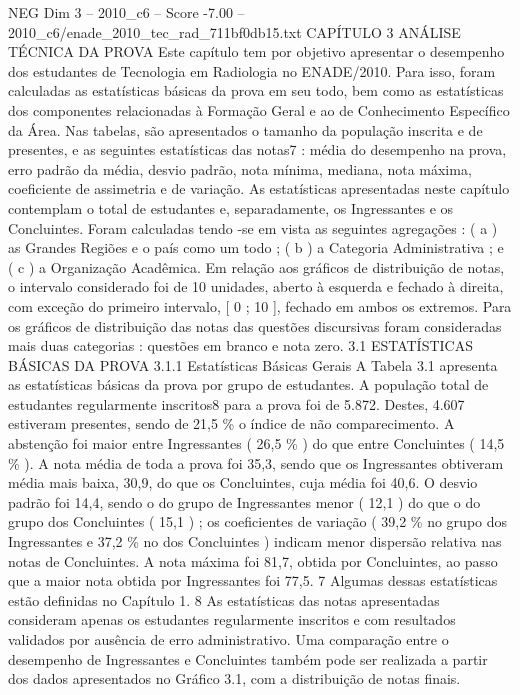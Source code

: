 \begin{textsample}{NEG Dim 3 – 2010\_c6 – Score -7.00 – 2010\_c6/enade\_2010\_tec\_rad\_711bf0db15.txt}  \label{ex:f3_neg_004}
CAPÍTULO 3 ANÁLISE TÉCNICA DA PROVA Este capítulo tem por objetivo apresentar o desempenho dos estudantes de Tecnologia em Radiologia no ENADE/2010.
Para isso, foram calculadas as estatísticas básicas da prova em seu todo, bem como as estatísticas dos componentes relacionadas à Formação Geral e ao de Conhecimento Específico da Área.
Nas tabelas, são apresentados o tamanho da população inscrita e de presentes, e as seguintes estatísticas das notas7 : média do desempenho na prova, erro padrão da média, desvio padrão, nota mínima, mediana, nota máxima, coeficiente de assimetria e de variação.
As estatísticas apresentadas neste capítulo contemplam o total de estudantes e, separadamente, os Ingressantes e os Concluintes.
Foram calculadas tendo -se em vista as seguintes agregações : ( a ) as Grandes Regiões e o país como um todo ; ( b ) a Categoria Administrativa ; e ( c ) a Organização Acadêmica.
Em relação aos gráficos de distribuição de notas, o intervalo considerado foi de 10 unidades, aberto à esquerda e fechado à direita, com exceção do primeiro intervalo, [ 0 ; 10 ], fechado em ambos os extremos.
Para os gráficos de distribuição das notas das questões discursivas foram consideradas mais duas categorias : questões em branco e nota zero. 3.1 ESTATÍSTICAS BÁSICAS DA PROVA 3.1.1 Estatísticas Básicas Gerais A Tabela 3.1 apresenta as estatísticas básicas da prova por grupo de estudantes.
A população total de estudantes regularmente inscritos8 para a prova foi de 5.872.
Destes, 4.607 estiveram presentes, sendo de 21,5 \% o índice de não comparecimento.
A abstenção foi maior entre Ingressantes ( 26,5 \% ) do que entre Concluintes ( 14,5 \% ).
A nota média de toda a prova foi 35,3, sendo que os Ingressantes obtiveram média mais baixa, 30,9, do que os Concluintes, cuja média foi 40,6.
O desvio padrão foi 14,4, sendo o do grupo de Ingressantes menor ( 12,1 ) do que o do grupo dos Concluintes ( 15,1 ) ; os coeficientes de variação ( 39,2 \% no grupo dos Ingressantes e 37,2 \% no dos Concluintes ) indicam menor dispersão relativa nas notas de Concluintes.
A nota máxima foi 81,7, obtida por Concluintes, ao passo que a maior nota obtida por Ingressantes foi 77,5. 7 Algumas dessas estatísticas estão definidas no Capítulo 1. 8 As estatísticas das notas apresentadas consideram apenas os estudantes regularmente inscritos e com resultados validados por ausência de erro administrativo.
Uma comparação entre o desempenho de Ingressantes e Concluintes também pode ser realizada a partir dos dados apresentados no Gráfico 3.1, com a distribuição de notas finais.

\end{textsample}
